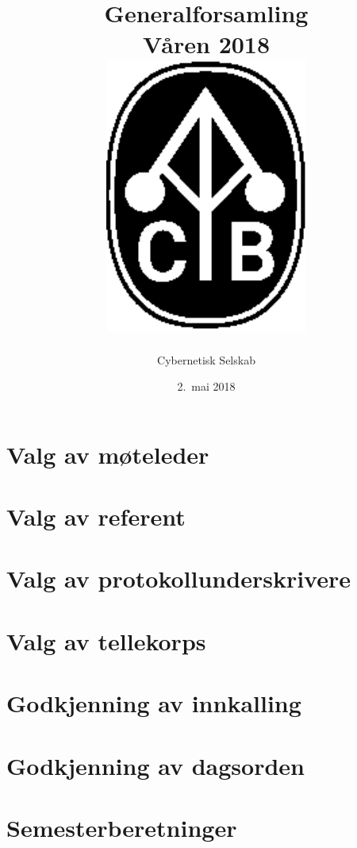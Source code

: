 \documentclass[10pt,norsk,a4paper]{article}
\title{Generalforsamling \\
	Våren 2018\\[3cm]
	\includegraphics[width=0.5\textwidth]{cyb-logo.eps}\\[-.5cm]}
\date{2.\ mai 2018}
\author{Cybernetisk Selskab}
\begin{document}
\maketitle{}
\newpage
\tableofcontents


\section{Valg av møteleder}

\section{Valg av referent}

\section{Valg av protokollunderskrivere}

\section{Valg av tellekorps}

\section{Godkjenning av innkalling}

\section{Godkjenning av dagsorden}

\section{Semesterberetninger}
\end{document}
